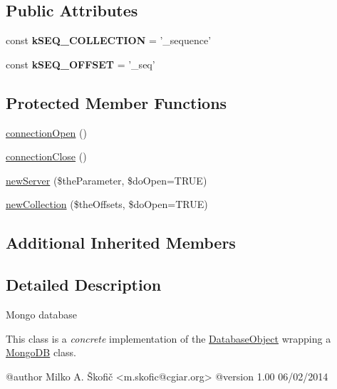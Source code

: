 \subsection*{Public Attributes}
\begin{DoxyCompactItemize}
\item 
\hypertarget{class_ontology_wrapper_1_1_mongo_database_a3d737abcfa3f477fa6b90fcd44cf6952}{const {\bfseries k\-S\-E\-Q\-\_\-\-C\-O\-L\-L\-E\-C\-T\-I\-O\-N} = '\-\_\-sequence'}\label{class_ontology_wrapper_1_1_mongo_database_a3d737abcfa3f477fa6b90fcd44cf6952}

\item 
\hypertarget{class_ontology_wrapper_1_1_mongo_database_a267f9e486b60ce3d63b67c2f215be9f2}{const {\bfseries k\-S\-E\-Q\-\_\-\-O\-F\-F\-S\-E\-T} = '\-\_\-seq'}\label{class_ontology_wrapper_1_1_mongo_database_a267f9e486b60ce3d63b67c2f215be9f2}

\end{DoxyCompactItemize}
\subsection*{Protected Member Functions}
\begin{DoxyCompactItemize}
\item 
\hyperlink{class_ontology_wrapper_1_1_mongo_database_a4b976e0857cbbbfd1fba2b33b7b2512c}{connection\-Open} ()
\item 
\hyperlink{class_ontology_wrapper_1_1_mongo_database_a0960889565708ebe8759388284043d6d}{connection\-Close} ()
\item 
\hyperlink{class_ontology_wrapper_1_1_mongo_database_ac3a49cd81d3ac17aa707258b6758b07c}{new\-Server} (\$the\-Parameter, \$do\-Open=T\-R\-U\-E)
\item 
\hyperlink{class_ontology_wrapper_1_1_mongo_database_a8e68fc8ae64675dffa862fcff79dea4b}{new\-Collection} (\$the\-Offsets, \$do\-Open=T\-R\-U\-E)
\end{DoxyCompactItemize}
\subsection*{Additional Inherited Members}


\subsection{Detailed Description}
Mongo database

This class is a {\itshape concrete} implementation of the \hyperlink{class_ontology_wrapper_1_1_database_object}{Database\-Object} wrapping a \hyperlink{}{Mongo\-D\-B} class. \begin{DoxyVerb} @author            Milko A. Škofič <m.skofic@cgiar.org>
 @version   1.00 06/02/2014\end{DoxyVerb}
 

